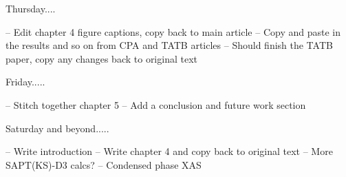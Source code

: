 Thursday....

-- Edit chapter 4 figure captions, copy back to main article
-- Copy and paste in the results and so on from CPA and TATB articles
-- Should finish the TATB paper, copy any changes back to original text

Friday.....

-- Stitch together chapter 5
-- Add a conclusion and future work section

Saturday and beyond.....

-- Write introduction
-- Write chapter 4 and copy back to original text
-- More SAPT(KS)-D3 calcs?
-- Condensed phase XAS

